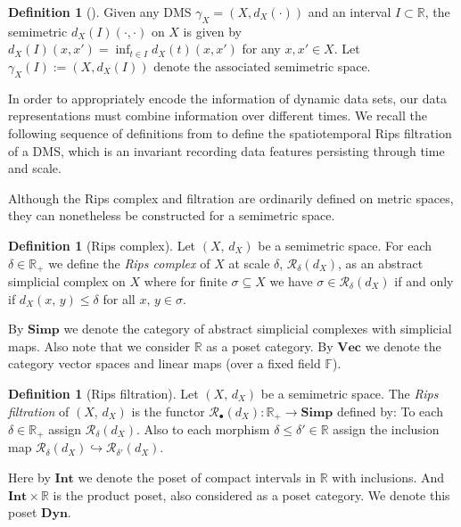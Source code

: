 \documentclass[a4paper,UKenglish,thm-restate]{article}
\theoremstyle{definition}
\newtheorem{definition}[theorem]{Definition}
\def\bsimp{\mathbf{Simp}}
\begin{document}
        \begin{definition}[\cite{spatiotemporal}]
            Given any DMS $\gamma_X = (X, d_X(\cdot))$ and an interval $I \subset \mathbb{R}$, the semimetric $d_X(I)(\cdot, \cdot)$ on $X$ is given by $d_X(I)(x, x') = \inf_{t \in I} d_X(t)(x, x')$ for any $x, x' \in X$. Let $\gamma_X(I) := (X, d_X(I))$ denote the associated semimetric space.
        \end{definition}


        In order to appropriately encode the information of dynamic data sets, our data representations must combine information over different times. We recall the following sequence of definitions from \cite{spatiotemporal} to define the spatiotemporal Rips filtration of a DMS, which is an invariant recording data features persisting through time and scale.

        Although the Rips complex and filtration are ordinarily defined on metric spaces, they can nonetheless be constructed for a semimetric space.
        \begin{definition}[Rips complex]
            Let $(X,\,d_X)$ be a semimetric space. For each $\delta\in\mathbb{R}_+$ we define the \emph{Rips complex} of $X$ at scale $\delta$, $\mathcal{R}_\delta(d_X)$, as an abstract simplicial complex on $X$ where for finite $\sigma\subseteq X$ we have $\sigma\in\mathcal{R}_\delta(d_X)$ if and only if $d_X(x,\,y)\leq\delta$ for all $x,\,y\in\sigma$.
        \end{definition}

        By $\bsimp$ we denote the category of abstract simplicial complexes with simplicial maps. Also note that we consider $\mathbb{R}$ as a poset category. By $\mathbf{Vec}$ we denote the category vector spaces and linear maps (over a fixed field $\mathbb{F}$). 

        \begin{definition}[Rips filtration]
            Let $(X,\,d_X)$ be a semimetric space. The \emph{Rips filtration} of $(X,\,d_X)$ is the functor $\mathcal{R}_\bullet(d_X):\mathbb{R}_+ \to \bsimp$ defined by: To each $\delta \in \mathbb{R}_+$ assign $\mathcal{R}_\delta(d_X)$. Also to each morphism $\delta\leq\delta'\in\mathbb{R}$ assign the inclusion map $\mathcal{R}_\delta(d_X)\hookrightarrow\mathcal{R}_{\delta'}(d_X)$.
        \end{definition}

        Here by $\mathbf{Int}$ we denote the poset of compact intervals in $\mathbb{R}$ with inclusions. And $\mathbf{Int}\times\mathbb{R}$ is the product poset, also considered as a poset category. We denote this poset $\mathbf{Dyn}$.
\end{document}

